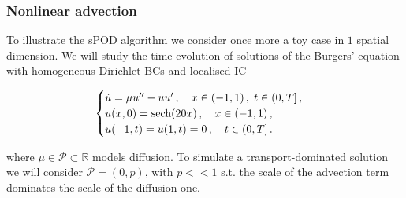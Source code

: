 \documentclass[../main.tex]{subfiles}
\begin{document}
\subsubsection{Nonlinear advection}\label{subsubsec:nonlinear_advection}

To illustrate the sPOD algorithm we consider once more a toy case in $1$ spatial dimension.
We will study the time-evolution of solutions of the Burgers' equation with homogeneous Dirichlet BCs and localised IC

\begin{equation}\label{eq:burgers}
   \begin{cases}
           \dot{u} = \mu u'' - uu' \,,\quad x\in(-1,1)\,,\;t\in(0,T]\,, \\
           u(x,0) = \text{sech}(20x)\,, \quad x\in(-1,1)\,, \\
           u(-1,t) = u(1,t) = 0\,, \quad t\in(0,T]\,. \\
   \end{cases}
\end{equation}

where $\mu\in \mathcal{P}\subset \mathbb{R}$ models diffusion. 
To simulate a transport-dominated solution we will consider $\mathcal{P}=(0,p)$, with $p<<1$ s.t. the scale of the advection term dominates the scale of the diffusion one. 



\end{document}
